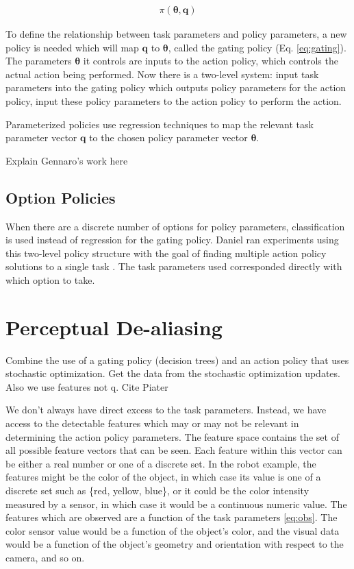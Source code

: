 \documentclass[12pt]{article}
\newcommand{\taskp}{\mathbf{q}}
\newcommand{\act}{\bm{\theta}}
\begin{document}
\begin{align}
\label{eq:gating}\pi(\act,\taskp)
\end{align}

 To define the relationship between task parameters and policy parameters, a new policy is needed which will map $\taskp$ to $\act$, called the gating policy (Eq. \ref{eq:gating}). The parameters $\act$ it controls are inputs to the action policy, which controls the actual action being performed. Now there is a two-level system: input task parameters into the gating policy which outputs policy parameters for the action policy, input these policy parameters to the action policy to perform the action. 


Parameterized policies use regression techniques to map the relevant task parameter vector $\taskp$ to the chosen policy parameter vector $\act$.

\color{red} Explain Gennaro's work here \color{black}

\subsection{Option Policies}

When there are a discrete number of options for policy parameters, classification is used instead of regression for the gating policy. Daniel ran experiments using this two-level policy structure with the goal of finding multiple action policy solutions to a single task \cite{daniel}. The task parameters used corresponded directly with which option to take. 


\section{Perceptual De-aliasing}

\color{red}Combine the use of a gating policy (decision trees) and an action policy that uses stochastic optimization. Get the data from the stochastic optimization updates. Also we use features not q. Cite Piater\color{black}

We don't always have direct excess to the task parameters. Instead, we have access to the detectable features which may or may not be relevant in determining the action policy parameters.  The feature space contains the set of all possible feature vectors that can be seen. Each feature within this vector can be either a real number or one of a discrete set. In the robot example, the features might be the color of the object, in which case its value is one of a discrete set such as \{red, yellow, blue\}, or it could be the color intensity measured by a sensor, in which case it would be a continuous numeric value. The features which are observed are a function of the task parameters \eqref{eq:obs}. The color sensor value would be a function of the object's color, and the visual data would be a function of the object's geometry and orientation with respect to the camera, and so on.
\end{document}
